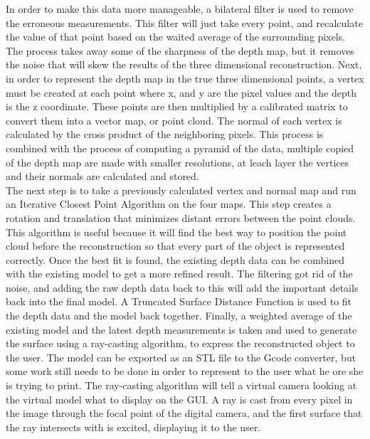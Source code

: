 \documentclass[12pt,twocolumn]{article}
\begin{document}
\indent In order to make this data more manageable, a bilateral filter is used to remove the erroneous measurements. This filter will just take every point, and recalculate the value of that point based on the waited average of the surrounding pixels. The process takes away some of the sharpness of the depth map, but it removes the noise that will skew the results of the three dimensional reconstruction. Next, in order to represent the depth map in the true three dimensional points, a vertex must be created at each point where x, and y are the pixel values and the depth is the z coordinate. These points are then multiplied by a calibrated matrix to convert them into a vector map, or point cloud. The normal of each vertex is calculated by the cross product of the neighboring pixels. This process is combined with the process of computing a pyramid of the data, multiple copied of the depth map are made with smaller resolutions, at leach layer the vertices and their normals are calculated and stored. \\

\indent The next step is to take a previously calculated vertex and normal map and run an Iterative Closest Point Algorithm on the four maps. This step creates a rotation and translation that minimizes distant errors between the point clouds. This algorithm is useful because it will find the best way to position the point cloud before the reconstruction so that every part of the object is represented correctly. Once the best fit is found, the existing depth data can be combined with the existing model to get a more refined result. The filtering got rid of the noise, and adding the raw depth data back to this will add the important details back into the final model. A Truncated Surface Distance Function is used to fit the depth data and the model back together. Finally, a weighted average of the existing model and the latest depth measurements is taken and used to generate the surface using a ray-casting algorithm, to express the reconstructed object to the user. The model can be exported as an STL file to the Gcode converter, but some work still needs to be done in order to represent to the user what he ore she is trying to print. The ray-casting algorithm will tell a virtual camera looking at the virtual model what to display on the GUI. A ray is cast from every pixel in the image through the focal point of the digital camera, and the first surface that the ray intersects with is excited, displaying it to the user.  \cite{cite8} \\
\end{document}
